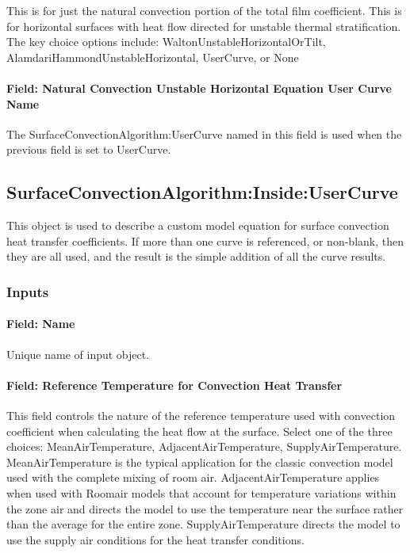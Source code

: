 This is for just the natural convection portion of the total film coefficient. This is for horizontal surfaces with heat flow directed for unstable thermal stratification. The key choice options include: WaltonUnstableHorizontalOrTilt, AlamdariHammondUnstableHorizontal, UserCurve, or None

\paragraph{Field: Natural Convection Unstable Horizontal Equation User Curve Name}\label{field-natural-convection-unstable-horizontal-equation-user-curve-name}

The SurfaceConvectionAlgorithm:UserCurve named in this field is used when the previous field is set to UserCurve.

\subsection{SurfaceConvectionAlgorithm:Inside:UserCurve}\label{surfaceconvectionalgorithminsideusercurve}

This object is used to describe a custom model equation for surface convection heat transfer coefficients. If more than one curve is referenced, or non-blank, then they are all used, and the result is the simple addition of all the curve results.

\subsubsection{Inputs}\label{inputs-8}

\paragraph{Field: Name}\label{field-name-7}

Unique name of input object.

\paragraph{Field: Reference Temperature for Convection Heat Transfer}\label{field-reference-temperature-for-convection-heat-transfer}

This field controls the nature of the reference temperature used with convection coefficient when calculating the heat flow at the surface. Select one of the three choices: MeanAirTemperature, AdjacentAirTemperature, SupplyAirTemperature. MeanAirTemperature is the typical application for the classic convection model used with the complete mixing of room air. AdjacentAirTemperature applies when used with Roomair models that account for temperature variations within the zone air and directs the model to use the temperature near the surface rather than the average for the entire zone. SupplyAirTemperature directs the model to use the supply air conditions for the heat transfer conditions.

